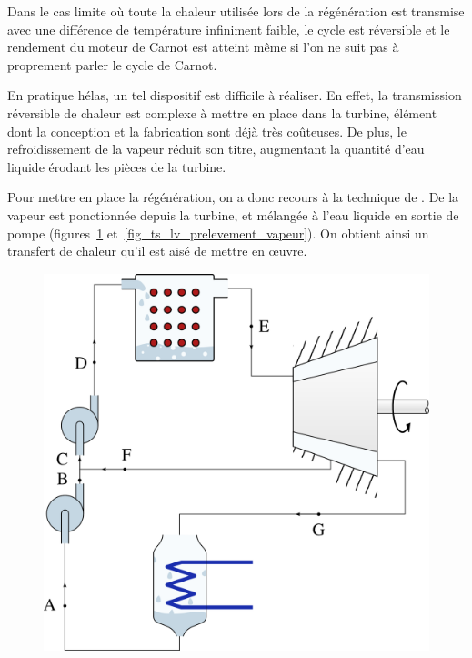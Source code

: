 		Dans le cas limite où toute la chaleur utilisée lors de la régénération est transmise avec une différence de température infiniment faible, le cycle est réversible et le rendement du moteur de Carnot est atteint même si l’on ne suit pas à proprement parler le cycle de Carnot.

		En pratique hélas, un tel dispositif est difficile à réaliser. En effet, la transmission réversible de chaleur est complexe à mettre en place dans la turbine, élément dont la conception et la fabrication sont déjà très coûteuses. De plus, le refroidissement de la vapeur réduit son titre, augmentant la quantité d’eau liquide érodant les pièces de la turbine.

		Pour mettre en place la régénération, on a donc recours à la technique de . De la vapeur est ponctionnée depuis la turbine, et mélangée à l’eau liquide en sortie de pompe (figures~\ref{fig_cycle_prélèvement_vapeur} et~\ref{fig_ts_lv_prelevement_vapeur}). On obtient ainsi un transfert de chaleur qu’il est aisé de mettre en œuvre.

		\begin{figure}
			\begin{center}
				\includegraphics[height=11cm]{images/circuit_prelevement.png}
			\end{center}
			\label{fig_cycle_prélèvement_vapeur}
		\end{figure}

